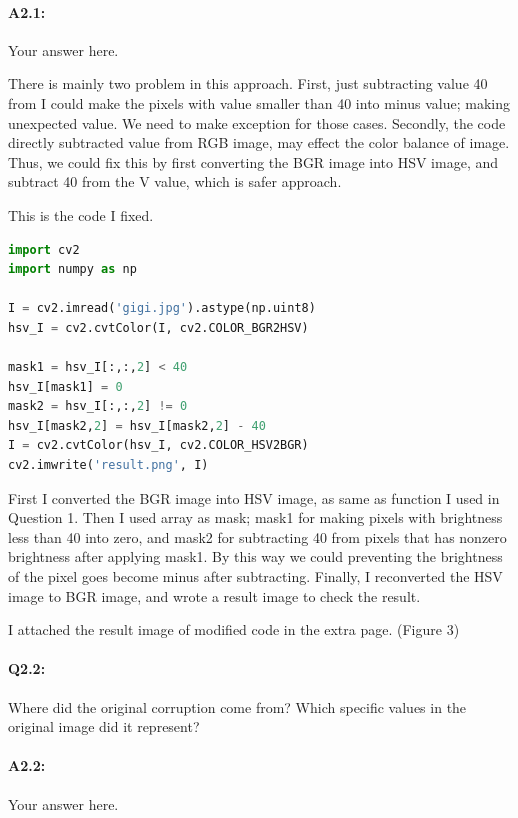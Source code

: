 \documentclass[11pt]{article}
\begin{document}
\paragraph{A2.1:} Your answer here.

There is mainly two problem in this approach. First, just subtracting value 40 from I could make the pixels with value smaller than 40 into minus value; making unexpected value. We need to make exception for those cases. Secondly, the code directly subtracted value from RGB image, may effect the color balance of image. Thus, we could fix this by first converting the BGR image into HSV image, and subtract 40 from the V value, which is safer approach.

This is the code I fixed.

\begin{lstlisting}[language=Python]
import cv2
import numpy as np

I = cv2.imread('gigi.jpg').astype(np.uint8)
hsv_I = cv2.cvtColor(I, cv2.COLOR_BGR2HSV)

mask1 = hsv_I[:,:,2] < 40
hsv_I[mask1] = 0
mask2 = hsv_I[:,:,2] != 0
hsv_I[mask2,2] = hsv_I[mask2,2] - 40
I = cv2.cvtColor(hsv_I, cv2.COLOR_HSV2BGR)
cv2.imwrite('result.png', I)
\end{lstlisting}

First I converted the BGR image into HSV image, as same as function I used in Question 1. Then I used array as mask; mask1 for making pixels with brightness less than 40 into zero, and mask2 for subtracting 40 from pixels that has nonzero brightness after applying mask1. By this way we could preventing the brightness of the pixel goes become minus after subtracting. Finally, I reconverted the HSV image to BGR image, and wrote a result image to check the result.

I attached the result image of modified code in the extra page. (Figure 3) 

\pagebreak
\paragraph{Q2.2:} Where did the original corruption come from? Which specific values in the original image did it represent?

\paragraph{A2.2:} Your answer here.
\end{document}
